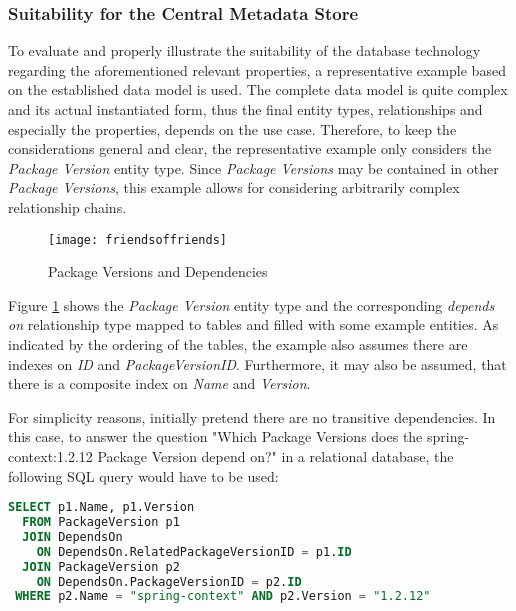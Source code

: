 \subsubsection{Suitability for the Central Metadata Store}
To evaluate and properly illustrate the suitability of the database technology regarding the aforementioned relevant properties, a representative example based on the established data model is used. The complete data model is quite complex and its actual instantiated form, thus the final entity types, relationships and especially the properties, depends on the use case. Therefore, to keep the considerations general and clear, the representative example only considers the \emph{Package Version} entity type. Since \emph{Package Versions} may be contained in other \emph{Package Versions}, this example allows for considering arbitrarily complex relationship chains.\par

\begin{figure}[H]
	\centering
	\texttt{[image: friendsoffriends]}
	\caption[Package Versions and Dependencies as Table]{Package Versions and Dependencies }
	\label{fig:PackageVersionsAndDependencies}
\end{figure}

Figure \ref{fig:PackageVersionsAndDependencies} shows the \emph{Package Version} entity type and the corresponding \emph{depends on} relationship type mapped to tables and filled with some example entities.  As indicated by the ordering of the tables, the example also assumes there are indexes on \emph{ID} and \emph{PackageVersionID}. Furthermore, it may also be assumed, that there is a composite index on \emph{Name} and \emph{Version}.\par
For simplicity reasons, initially pretend there are no transitive dependencies. In this case, to answer the question "Which Package Versions does the spring-context:1.2.12 Package Version depend on?" in a relational database, the following SQL query would have to be used:

\begin{lstlisting}[language=SQL, caption=Package Version Dependencies, captionpos=b, label=lst:PackageVersionDependencies]
SELECT p1.Name, p1.Version
  FROM PackageVersion p1 
  JOIN DependsOn
    ON DependsOn.RelatedPackageVersionID = p1.ID
  JOIN PackageVersion p2
    ON DependsOn.PackageVersionID = p2.ID
 WHERE p2.Name = "spring-context" AND p2.Version = "1.2.12"
\end{lstlisting}

